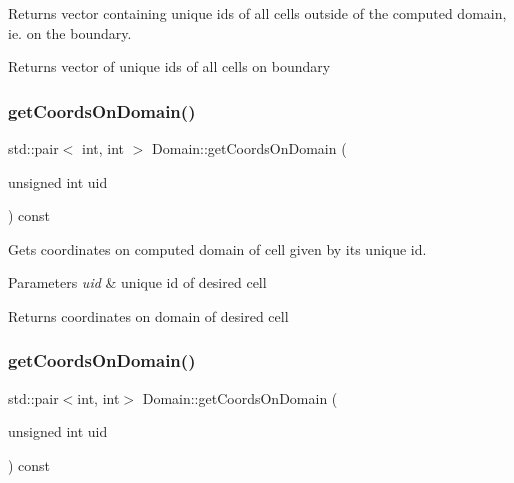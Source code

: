 Returns vector containing unique ids of all cells outside of the computed domain, ie. on the boundary. 

\begin{DoxyReturn}{Returns}
vector of unique ids of all cells on boundary 
\end{DoxyReturn}
\mbox{\label{classDomain_a1d2f7ee9336c682d4d6b01893d0beb4f}} 
\subsubsection{\texorpdfstring{get\+Coords\+On\+Domain()}{getCoordsOnDomain()}\hspace{0.1cm}{\footnotesize\ttfamily [1/2]}}
{\footnotesize\ttfamily std\+::pair$<$ int, int $>$ Domain\+::get\+Coords\+On\+Domain (\begin{DoxyParamCaption}\item[{unsigned int}]{uid }\end{DoxyParamCaption}) const}



Gets coordinates on computed domain of cell given by its unique id. 


\begin{DoxyParams}{Parameters}
{\em uid} & unique id of desired cell\\
\hline
\end{DoxyParams}
\begin{DoxyReturn}{Returns}
coordinates on domain of desired cell 
\end{DoxyReturn}
\mbox{\label{classDomain_a7eba31dcda6d3a45f41a3839a34706c8}} 
\subsubsection{\texorpdfstring{get\+Coords\+On\+Domain()}{getCoordsOnDomain()}\hspace{0.1cm}{\footnotesize\ttfamily [2/2]}}
{\footnotesize\ttfamily std\+::pair$<$int, int$>$ Domain\+::get\+Coords\+On\+Domain (\begin{DoxyParamCaption}\item[{unsigned int}]{uid }\end{DoxyParamCaption}) const}




